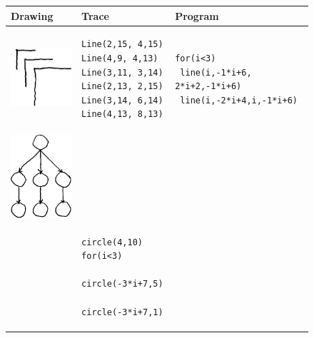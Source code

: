 \documentclass{article}
\begin{document}
\begin{figure}
  \begin{tabular}{m{2.5cm}ll}
    \toprule
    \textbf{Drawing}&\textbf{Trace}&\textbf{Program}\\
    \midrule
    \includegraphics[width = \exampleDrawingSize]{figures/expert-29-trim.png}&
\begin{minipage}{\exampleTraceSize}\begin{verbatim}
Line(2,15, 4,15)
Line(4,9, 4,13)
Line(3,11, 3,14)
Line(2,13, 2,15)
Line(3,14, 6,14)
Line(4,13, 8,13)
\end{verbatim}
\end{minipage}&     \begin{minipage}{\exampleProgramSize} \begin{verbatim}
for(i<3)
 line(i,-1*i+6, 2*i+2,-1*i+6)
 line(i,-2*i+4,i,-1*i+6)
       \end{verbatim}
     \end{minipage}&\\\midrule
     \includegraphics[width = \exampleDrawingSize]{figures/expert-52-trim.png}&
\begin{minipage}{\exampleTraceSize}\begin{verbatim}
Line(5,13, 2,10),
  arrow = True)
Circle(center = (5,9)
Circle(center = (8,5)
Line(2,8, 2,6), 
  arrow = True)
Circle(center = (2,5)
Circle(center = (5,14)
Circle(center = (2,9)
\end{verbatim}
\emph{... etc. ...}\\
\end{minipage}&
             \begin{minipage}{\exampleProgramSize}\begin{verbatim}
circle(4,10)
for(i<3)
 circle(-3*i+7,5)
 circle(-3*i+7,1)

\end{verbatim}
\end{minipage}
\end{tabular}
\end{figure}
\end{document}
